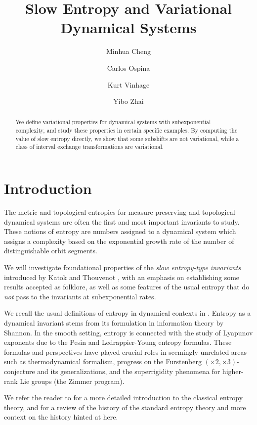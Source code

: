 \documentclass[oneside]{amsart}
\title{Slow Entropy and Variational Dynamical Systems}
\author[Cheng]{Minhua Cheng}
\author[Ospina]{Carlos Ospina}
\author{Kurt Vinhage}
\author[Zhai]{Yibo Zhai}
\theoremstyle{plain}
\theoremstyle{definition}
\newcommand{\<}{\langle}
\renewcommand{\>}{\rangle}
\renewcommand{\|}{|\!|} %
\begin{document}
\begin{abstract}
    We define variational properties for dynamical systems with subexponential complexity, and study these properties in certain specific examples. By computing the value of slow entropy directly, we show that some subshifts are not variational, while a class of interval exchange transformations are variational.
\end{abstract}

\maketitle


\section{Introduction}

The metric and topological entropies for measure-preserving and topological dynamical systems are often the first and most important invariants to study. These notions of entropy are numbers assigned to a dynamical system which assigns a complexity based on the exponential growth rate of the number of distinguishable orbit segments.

We will investigate foundational properties of the {\it slow entropy-type invariants} introduced by Katok and Thouvenot \cite{KatokThouvenot}, with an emphasis on establishing some results accepted as folklore, as well as some features of the usual entropy that do {\it not} pass to the invariants at subexponential rates. 

We recall the usual definitions of entropy in dynamical contexts in . Entropy as a dynamical invariant stems from its formulation in information theory by Shannon. In the smooth setting, entropy is connected with the study of Lyapunov exponents due to the Pesin and Ledrappier-Young entropy formulas. These formulas and perspectives have played crucial roles in seemingly unrelated areas such as thermodynamical formalism, progress on the Furstenberg $(\times 2, \times 3)$-conjecture and its generalizations, and the superrigidity phenomena for higher-rank Lie groups (the Zimmer program).

We refer the reader to \cite[Sections 3.1, 4.3]{hasselblatt-katok} for a more detailed introduction to the classical entropy theory, and \cite{50yearsofentropy} for a review of the history of the standard entropy theory and more context on the history hinted at here.
\end{document}
